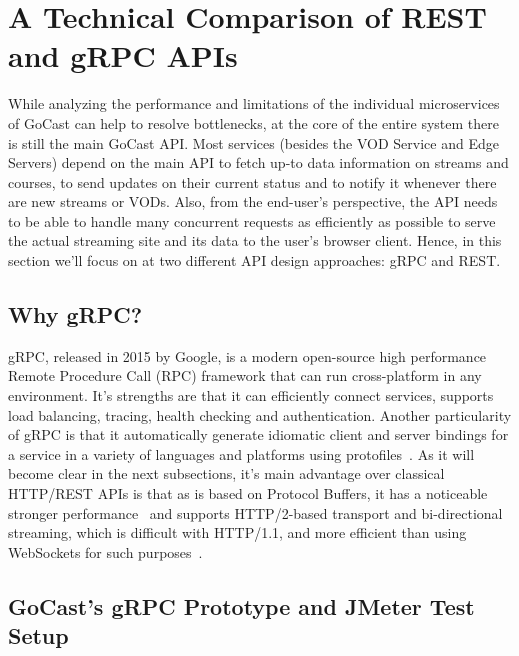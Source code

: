 
\section{A Technical Comparison of REST and gRPC APIs}

While analyzing the performance and limitations of the individual microservices of GoCast can help to resolve bottlenecks, at the core of the entire system there is still the main GoCast \ac{API}.
Most services (besides the VOD Service and Edge Servers) depend on the main \ac{API} to fetch up-to data information on streams and courses, to send updates on their current status and to notify it whenever there are new streams or \ac{VOD}s. Also, from the end-user's perspective, the \ac{API} needs to be able to handle many concurrent requests as efficiently as possible to serve the actual streaming site and its data to the user's browser client.
Hence, in this section we'll focus on at two different \ac{API} design approaches: gRPC and REST.

\subsection{Why gRPC?}

gRPC, released in 2015 by Google, is a modern open-source high performance Remote Procedure Call (RPC) framework that can run cross-platform in any environment. It's strengths are that it can efficiently connect services, supports load balancing, tracing, health checking and authentication.
Another particularity of gRPC is that it automatically generate idiomatic client and server bindings for a service in a variety of languages and platforms using protofiles~\parencite{grpc_vs_rest}.
As it will become clear in the next subsections, it's main advantage over classical HTTP/REST \ac{API}s is that as is based on Protocol Buffers, it has a noticeable stronger performance~\parencite{grpc_vs_rest_2} and supports HTTP/2-based transport and bi-directional streaming, which is difficult with HTTP/1.1, and more efficient than using WebSockets for such purposes~\parencite{grpc_dev}.

\subsection{GoCast's gRPC Prototype and JMeter Test Setup}


